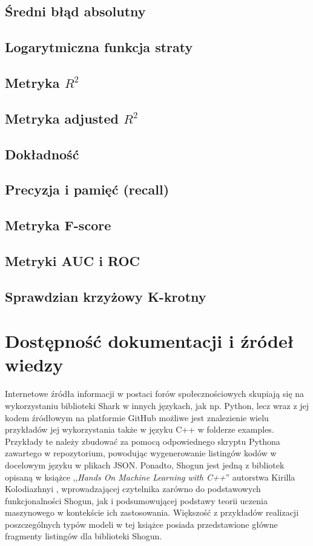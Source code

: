 
\subsection{Średni błąd absolutny}

\subsection{Logarytmiczna funkcja straty}
\subsection{Metryka $R^2$}
\subsection{Metryka adjusted $R^2$}
\subsection{Dokładność}
\subsection{Precyzja i pamięć (recall)}
\subsection{Metryka F-score}
\subsection{Metryki AUC i ROC}

\subsection{Sprawdzian krzyżowy K-krotny}


\section{Dostępność dokumentacji i źródeł wiedzy}

Internetowe źródła informacji w postaci forów społecznościowych skupiają się na wykorzystaniu biblioteki Shark w innych językach, jak np. Python, lecz wraz z jej kodem źródłowym na platformie GitHub \cite{shogun:github} możliwe jest znalezienie wielu przykładów jej wykorzystania także w języku C++ w folderze examples. Przykłady te należy zbudować za pomocą odpowiednego skryptu Pythona zawartego w repozytorium, powodując wygenerowanie listingów kodów w docelowym języku w plikach JSON. Ponadto, Shogun jest jedną z bibliotek opisaną w książce ,,\textit{Hands On Machine Learning with C++}'' autorstwa Kirilla Kolodiazhnyi \cite{handsOnMachineLearning}, wprowadzającej czytelnika zarówno do podstawowych funkcjonalności Shogun, jak i podsumowującej podstawy teorii uczenia maszynowego w kontekście ich zastosowania. Większość z przykładów realizacji poszczególnych typów modeli w tej książce posiada przedstawione główne fragmenty listingów dla biblioteki Shogun.

